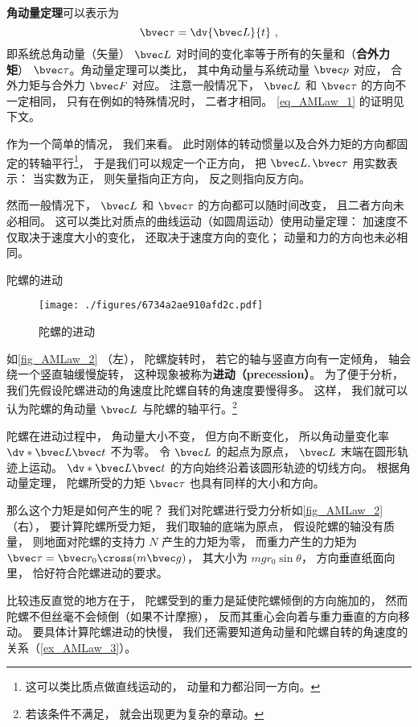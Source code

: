 
\textbf{角动量定理}可以表示为
\begin{equation}\label{eq_AMLaw_1}
\bvec \tau = \dv{\bvec L}{t}~,
\end{equation}
即系统总角动量（矢量） $\bvec L$ 对时间的变化率等于所有的矢量和（\textbf{合外力矩}） $\bvec \tau$。角动量定理可以类比， 其中角动量与系统动量 $\bvec p$ 对应， 合外力矩与合外力 $\bvec F$ 对应。 注意一般情况下， $\bvec L$ 和 $\bvec \tau$ 的方向不一定相同， 只有在例如的特殊情况时， 二者才相同。 \autoref{eq_AMLaw_1} 的证明见下文。

作为一个简单的情况， 我们来看。 此时刚体的转动惯量以及合外力矩的方向都固定的转轴平行\footnote{这可以类比质点做直线运动的， 动量和力都沿同一方向。}， 于是我们可以规定一个正方向， 把 $\bvec L, \bvec \tau$ 用实数表示： 当实数为正， 则矢量指向正方向， 反之则指向反方向。

然而一般情况下， $\bvec L$ 和 $\bvec \tau$ 的方向都可以随时间改变， 且二者方向未必相同。 这可以类比对质点的曲线运动（如圆周运动）使用动量定理： 加速度不仅取决于速度大小的变化， 还取决于速度方向的变化； 动量和力的方向也未必相同。
\begin{example}{陀螺的进动}\label{ex_AMLaw_2}
\begin{figure}[ht]
\centering
\texttt{[image: ./figures/6734a2ae910afd2c.pdf]}
\caption{陀螺的进动}\label{fig_AMLaw_2}
\end{figure}

如\autoref{fig_AMLaw_2} （左）， 陀螺旋转时， 若它的轴与竖直方向有一定倾角， 轴会绕一个竖直轴缓慢旋转， 这种现象被称为\textbf{进动（precession）}。 为了便于分析， 我们先假设陀螺进动的角速度比陀螺自转的角速度要慢得多。 这样， 我们就可以认为陀螺的角动量 $\bvec L$ 与陀螺的轴平行。\footnote{若该条件不满足， 就会出现更为复杂的章动。} %

陀螺在进动过程中， 角动量大小不变， 但方向不断变化， 所以角动量变化率 $\dv*{\bvec L}{\bvec t}$ 不为零。 令 $\bvec L$ 的起点为原点， $\bvec L$ 末端在圆形轨迹上运动。 $\dv*{\bvec L}{\bvec t}$ 的方向始终沿着该圆形轨迹的切线方向。 根据角动量定理， 陀螺所受的力矩 $\bvec \tau$ 也具有同样的大小和方向。

那么这个力矩是如何产生的呢？ 我们对陀螺进行受力分析如\autoref{fig_AMLaw_2} （右）， 要计算陀螺所受力矩， 我们取轴的底端为原点， 假设陀螺的轴没有质量， 则地面对陀螺的支持力 $N$ 产生的力矩为零， 而重力产生的力矩为 $\bvec \tau = \bvec r_0 \cross (m\bvec g)$， 其大小为 $mgr_0\sin\theta$， 方向垂直纸面向里， 恰好符合陀螺进动的要求。

比较违反直觉的地方在于， 陀螺受到的重力是延使陀螺倾倒的方向施加的， 然而陀螺不但丝毫不会倾倒（如果不计摩擦）， 反而其重心会向着与重力垂直的方向移动。 要具体计算陀螺进动的快慢， 我们还需要知道角动量和陀螺自转的角速度的关系（\autoref{ex_AMLaw_3}）。
\end{example}

